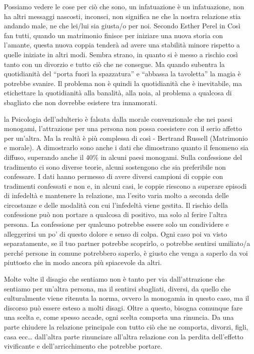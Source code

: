\documentclass[12pt]{book} %
\begin{document}
Possiamo vedere le cose per ciò che sono, un infatuazione è
un infatuazione, non ha altri messaggi nascosti, inconsci, non significa ne che la nostra relazione stia andando male,
ne che lei/lui sia giusta/o per noi. Secondo Esther Perel in Così fan
tutti, quando un matrimonio finisce per iniziare una nuova storia con
l'amante, questa nuova coppia tenderà ad avere una stabilità minore rispetto a quelle iniziate in altri modi. Sembra strano, in
quanto si è messo a rischio così tanto con un divorzio e tutto ciò che ne consegue. Ma quando subentra la quotidianità
del “porta fuori la spazzatura” e “abbassa la tavoletta” la magia è potrebbe svanire. Il problema non è quindi la
quotidianità che è inevitabile, ma etichettare la quotidianità alla banalità, alla noia, al problema a qualcosa di sbagliato che non dovrebbe esistere tra innamorati.

la Psicologia dell'adulterio è falsata dalla morale convenzionale che nei paesi monogami,
l'attrazione per una persona non possa coesistere con il serio affetto per
un'altra. Ma la realtà è più complessa di così - Bertrand Russell (Matrimonio e
morale).
A dimostrarlo sono anche i dati che dimostrano quanto il fenomeno sia diffuso, superando anche il 40\% in alcuni paesi monogami.
Sulla confessione del tradimento ci sono diverse teorie, alcuni sostengono che sia preferibile non confessare. I dati hanno permesso di avere diversi campioni di coppie con tradimenti confessati e non e, in alcuni casi, le coppie riescono a superare episodi di infedeltà e mantenere la relazione, ma l'esito varia molto a seconda delle circostanze e delle modalità con cui l'infedeltà viene gestita. Il rischio della confessione può non portare a qualcosa di positivo, ma solo al ferire l'altra persona. La confessione per qualcuno potrebbe essere solo un condividere e alleggerirsi un po' di questo dolore e senso di colpa. 
Ogni caso poi va visto separatamente, se il tuo partner potrebbe scoprirlo, o potrebbe sentirsi umiliato/a perché persone in comune potrebbero saperlo, è giusto che venga a saperlo da voi piuttosto che in modo ancora più spiacevole da altri.

Molte volte il disagio che sentiamo non è tanto per via dall'attrazione che sentiamo per
un'altra persona, ma il sentirsi sbagliati, diversi, da quello che culturalmente viene ritenuta la
norma, ovvero la monogamia in questo caso, ma il discorso può essere esteso a molti disagi. Oltre a
questo, bisogna comunque fare una scelta e, come spesso accade, ogni scelta comporta una rinuncia. Da una parte
chiudere la relazione principale con tutto ciò che ne comporta, divorzi, figli, casa ecc…
dall'altra parte rinunciare all'altra relazione con la perdita
dell'effetto vivificante e dell'arricchimento che potrebbe portare. 
\end{document}

